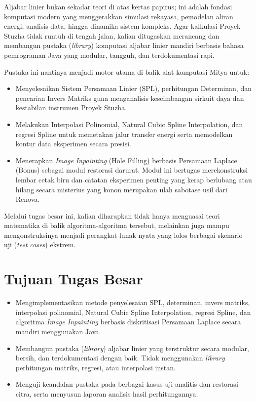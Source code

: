 \documentclass[12pt,a4paper]{report}
\begin{document}
Aljabar linier bukan sekadar teori di atas kertas papirus; ini adalah fondasi
komputasi modern yang menggerakkan simulasi rekayasa, pemodelan aliran energi,
analisis data, hingga dinamika sistem kompleks. Agar kalkulasi Proyek Stuzha
tidak runtuh di tengah jalan, kalian ditugaskan merancang dan membangun pustaka
(\textit{library}) komputasi aljabar linier mandiri berbasis bahasa pemrograman
Java yang modular, tangguh, dan terdokumentasi rapi.

Pustaka ini nantinya menjadi motor utama di balik alat komputasi Mitya untuk:

\begin{itemize}
    \item Menyelesaikan Sistem Persamaan Linier (SPL), perhitungan Determinan,
          dan pencarian Invers Matriks guna menganalisis keseimbangan sirkuit
          daya dan kestabilan instrumen Proyek Stuzha.
    \item Melakukan Interpolasi Polinomial, Natural Cubic Spline Interpolation,
          dan regresi Spline untuk memetakan jalur transfer energi serta
          memodelkan kontur data eksperimen secara presisi.
    \item Menerapkan \textit{Image Inpainting} (Hole Filling) berbasis Persamaan
          Laplace (Bonus) sebagai modul restorasi darurat. Modul ini bertugas
          merekonstruksi lembar cetak biru dan catatan eksperimen penting yang
          kerap berlubang atau hilang secara misterius yang konon merupakan
          ulah sabotase usil dari Renova.
\end{itemize}

Melalui tugas besar ini, kalian diharapkan tidak hanya menguasai teori matematika
di balik algoritma-algoritma tersebut, melainkan juga mampu mengonstruksinya
menjadi perangkat lunak nyata yang lolos berbagai skenario uji
(\textit{test cases}) ekstrem.

\section{Tujuan Tugas Besar}

\begin{itemize}
    \item Mengimplementasikan metode penyelesaian SPL, determinan, invers
          matriks, interpolasi polinomial, Natural Cubic Spline Interpolation,
          regresi Spline, dan algoritma \textit{Image Inpainting} berbasis
          diskritisasi Persamaan Laplace secara mandiri menggunakan Java.
    \item Membangun pustaka (\textit{library}) aljabar linier yang terstruktur
          secara modular, bersih, dan terdokumentasi dengan baik. Tidak
          menggunakan \textit{library} perhitungan matriks, regresi, atau
          interpolasi instan.
    \item Menguji keandalan pustaka pada berbagai kasus uji analitis dan
          restorasi citra, serta menyusun laporan analisis hasil perhitungannya.
\end{itemize}    
\end{document}
